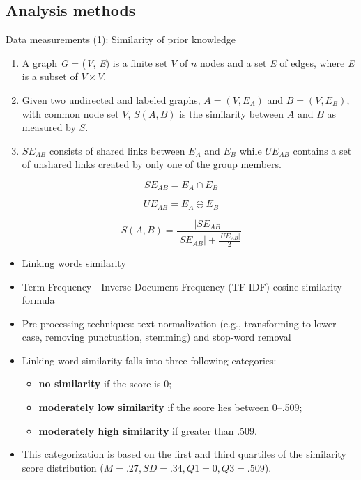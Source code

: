 \subsection{Analysis methods}
\begin{frame}[allowframebreaks]{Data measurements (1): Similarity of prior knowledge}
    \begin{enumerate}
        \item A graph \textit{G} = (\textit{V}, \textit{E}) is a finite set $V$ 
        of $n$ nodes and a set \textit{E} of edges, where \textit{E} is a 
        subset of $V \times V$.
        \item Given two undirected and labeled graphs, $A = (V, E_A)$ and 
        $B = (V, E_B)$, with common node set $V$, $S(A, B)$ is the similarity 
        between $A$ and $B$ as measured by $S$. 
        \item $SE_{AB}$ consists of shared links between $E_A$ and $E_B$ 
        while $UE_{AB}$ contains a set of unshared links created by 
        only one of the group members.
    \end{enumerate}
     
    \begin{equation}
      SE_{AB} = E_A \cap E_B \label{eq:1}
    \end{equation}
    
    \begin{equation}
      UE_{AB} = E_A \ominus E_B \label{eq:2}
    \end{equation}
    
    \begin{equation}
      S(A, B) = \frac{|SE_{AB}|}{{|SE_{AB}| + \frac{|UE_{AB}|}{2}}} \label{eq:3}
    \end{equation}
    
    \begin{itemize}
        \item Linking words similarity
        \item Term Frequency - Inverse Document Frequency (TF-IDF) cosine similarity
              formula 
        \item Pre-processing techniques: text normalization 
              (e.g., transforming to lower case, removing punctuation, stemming) 
              and stop-word removal
        \item Linking-word similarity falls into three following categories: 
        \begin{itemize}
            \item \textbf{no similarity} if the score is 0; 
            \item \textbf{moderately low similarity} if the score lies between 0--.509;
            \item \textbf{moderately high similarity} if greater than .509.
        \end{itemize} 
        \item This categorization is based on the first and third quartiles 
        of the similarity score distribution ($M = .27, SD = .34, Q1 = 0, Q3 = .509$).
    \end{itemize}


\end{frame}

